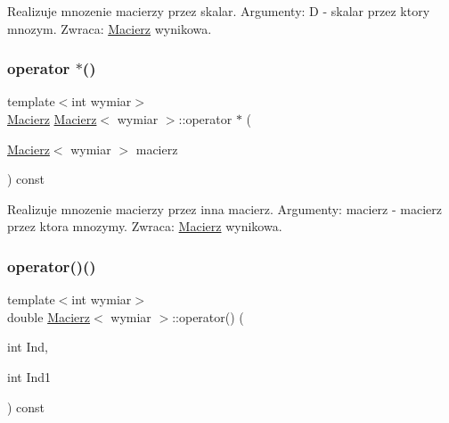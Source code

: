 Realizuje mnozenie macierzy przez skalar. Argumenty\+: D -\/ skalar przez ktory mnozym. Zwraca\+: \mbox{\hyperlink{class_macierz}{Macierz}} wynikowa. \mbox{\label{class_macierz_af7de2a2c8d9fd868fa41a530112baa4e}} 
\subsubsection{\texorpdfstring{operator $\ast$()}{operator *()}\hspace{0.1cm}{\footnotesize\ttfamily [3/3]}}
{\footnotesize\ttfamily template$<$int wymiar$>$ \\
\mbox{\hyperlink{class_macierz}{Macierz}} \mbox{\hyperlink{class_macierz}{Macierz}}$<$ wymiar $>$\+::operator $\ast$ (\begin{DoxyParamCaption}\item[{\mbox{\hyperlink{class_macierz}{Macierz}}$<$ wymiar $>$}]{macierz }\end{DoxyParamCaption}) const\hspace{0.3cm}{\ttfamily [inline]}}

Realizuje mnozenie macierzy przez inna macierz. Argumenty\+: macierz -\/ macierz przez ktora mnozymy. Zwraca\+: \mbox{\hyperlink{class_macierz}{Macierz}} wynikowa. \mbox{\label{class_macierz_a536c8c19130df4b64467de2745bcdd4b}} 
\subsubsection{\texorpdfstring{operator()()}{operator()()}\hspace{0.1cm}{\footnotesize\ttfamily [1/2]}}
{\footnotesize\ttfamily template$<$int wymiar$>$ \\
double \mbox{\hyperlink{class_macierz}{Macierz}}$<$ wymiar $>$\+::operator() (\begin{DoxyParamCaption}\item[{int}]{Ind,  }\item[{int}]{Ind1 }\end{DoxyParamCaption}) const\hspace{0.3cm}{\ttfamily [inline]}}

